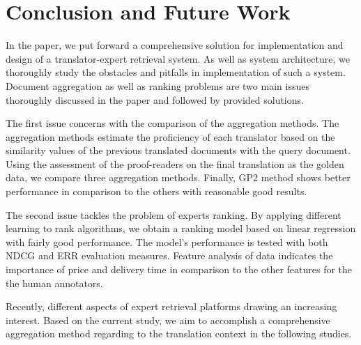 \section{Conclusion and Future Work}
\label{sec:conclusion}
In the paper, we put forward a comprehensive solution for implementation and design of a translator-expert retrieval system. As well as system architecture, we thoroughly study the obstacles and pitfalls in implementation of such a system. Document aggregation as well as ranking problems are two main issues thoroughly discussed in the paper and followed by provided solutions.

The first issue concerns with the comparison of the aggregation methods. The aggregation methods estimate the proficiency of each translator based on the similarity values of the previous translated documents with the query document. Using the assessment of the proof-readers on the final translation as the golden data, we compare three aggregation methods. Finally, GP2 method shows better performance in comparison to the others with reasonable good results.

The second issue tackles the problem of experts ranking. By applying different learning to rank algorithms, we obtain a ranking model based on linear regression with fairly good performance. The model's performance is tested with both NDCG and ERR evaluation measures. Feature analysis of data indicates the importance of price and delivery time in comparison to the other features for the the human annotators.

Recently, different aspects of expert retrieval platforms drawing an increasing interest. Based on the current study, we aim to accomplish a comprehensive aggregation method regarding to the translation context in the following studies.